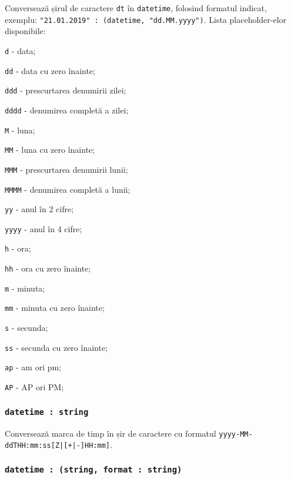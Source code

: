 Conversează șirul de caractere \texttt{dt} în \texttt{datetime}, folosind formatul indicat, exemplu: \texttt{"21.01.2019" : (datetime, "dd.MM.yyyy")}. Lista placeholder-elor disponibile:
\begin{icItems}
	\item \texttt{d} - data;
	\item \texttt{dd} - data cu zero înainte;
	\item \texttt{ddd} - prescurtarea denumirii zilei;
	\item \texttt{dddd} - denumirea completă a zilei;
	\item \texttt{M} - luna;
	\item \texttt{MM} - luna cu zero înainte;
	\item \texttt{MMM} - prescurtarea denumirii lunii;
	\item \texttt{MMMM} - denumirea completă a lunii;
	\item \texttt{yy} - anul în 2 cifre;
	\item \texttt{yyyy} - anul în 4 cifre;
	\item \texttt{h} - ora;
	\item \texttt{hh} - ora cu zero înainte;
	\item \texttt{m} - minuta;
	\item \texttt{mm} - minuta cu zero înainte;
	\item \texttt{s} - secunda;
	\item \texttt{ss} - secunda cu zero înainte;
	\item \texttt{ap} - am ori pm;
	\item \texttt{AP} - AP ori PM;
\end{icItems}

\subsubsection{\texttt{datetime : string}}

Conversează marca de timp în șir de caractere cu formatul \texttt{yyyy-MM-ddTHH:mm:ss[Z|[+|-]HH:mm]}.

\subsubsection{\texttt{datetime : (string, format : string)}}

